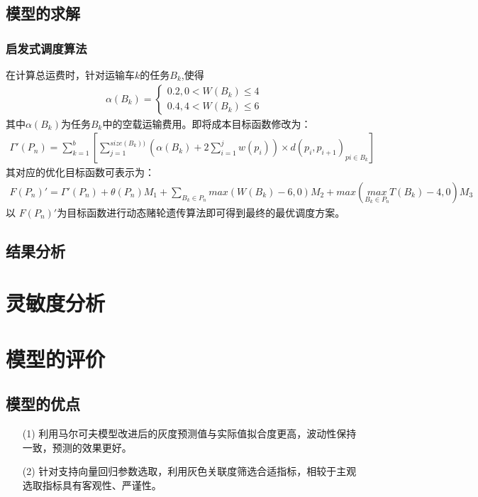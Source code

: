 \documentclass{whutmod}
\begin{document}
    \subsection{模型的求解}
     \subsubsection{启发式调度算法}
    在计算总运费时，针对运输车$k$的任务$B_k$,使得
    \begin{gather}
    \alpha (B_k)=\left\{\begin{matrix}0.2,0<W(B_k)\leqslant4
    \\ 0.4,4<W(B_k)\leqslant6
    \end{matrix}\right.
    \end{gather}
    其中$\alpha (B_k)$为任务$B_k$中的空载运输费用。即将成本目标函数修改为：
    \begin{gather}
    \Gamma '(P_n)=\sum _{k=1}^b[\sum _{j=1}^{size(B_k))}(\alpha (B_k)+2\sum _{i=1}^jw(p_i))\times d(p_i,p_{i+1})_{pi\in B_k}]
    \end{gather}
    其对应的优化目标函数可表示为：
      \begin{gather}
    F(P_n)'= \Gamma '(P_n)+\theta(P_n)M_1+\sum_{B_k\in P_n}max( W (B_k)-6 ,0) M_2+max(\underset{B_k\in P_n}{max}T (B_k)-4,0)M_3
    \end{gather}
    以  $F(P_n)'$为目标函数进行动态赌轮遗传算法即可得到最终的最优调度方案。
       \subsection{结果分析}
    
    
   
   
   
   
    \section{灵敏度分析}
  
  
  
  \section{模型的评价}
  \subsection{模型的优点}
  \begin{itemize}                                             
  	\item [(1)] 利用马尔可夫模型改进后的灰度预测值与实际值拟合度更高，波动性保持一致，预测的效果更好。
  	\item [(2)] 针对支持向量回归参数选取，利用灰色关联度筛选合适指标，相较于主观选取指标具有客观性、严谨性。	
  \end{itemize}
\end{document}
